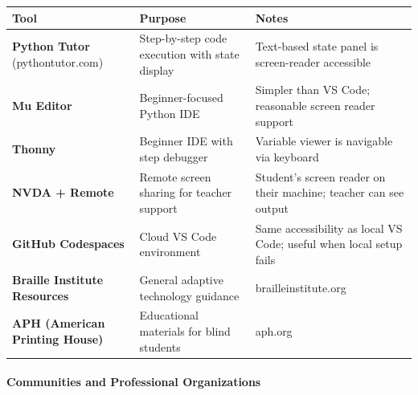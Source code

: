 \documentclass[
  justified,
  openright,
]{tufte-book}
\let\subsection\paragraph
\let\paragraph\paragraph
\let\subsection\paragraph
\let\paragraph\paragraph
\begin{document}
\begin{fullwidth}{\def\LTcaptype{none} %
\begin{longtable}[]{@{}
  >{\raggedright\arraybackslash}p{}
  >{\raggedright\arraybackslash}p{}
  >{\raggedright\arraybackslash}p{}@{}}
\toprule\noalign{}
\begin{minipage}[b]{\linewidth}\raggedright
Tool
\end{minipage} & \begin{minipage}[b]{\linewidth}\raggedright
Purpose
\end{minipage} & \begin{minipage}[b]{\linewidth}\raggedright
Notes
\end{minipage} \\
\midrule\noalign{}
\endhead
\bottomrule\noalign{}
\endlastfoot
\textbf{Python Tutor} (pythontutor.com) & Step-by-step code execution
with state display & Text-based state panel is screen-reader
accessible \\
\textbf{Mu Editor} & Beginner-focused Python IDE & Simpler than VS Code;
reasonable screen reader support \\
\textbf{Thonny} & Beginner IDE with step debugger & Variable viewer is
navigable via keyboard \\
\textbf{NVDA + Remote} & Remote screen sharing for teacher support &
Student's screen reader on their machine; teacher can see output \\
\textbf{GitHub Codespaces} & Cloud VS Code environment & Same
accessibility as local VS Code; useful when local setup fails \\
\textbf{Braille Institute Resources} & General adaptive technology
guidance & brailleinstitute.org \\
\textbf{APH (American Printing House)} & Educational materials for blind
students & aph.org \\
\end{longtable}
}
\end{fullwidth}

\subsection{Communities and Professional
Organizations}\label{communities-and-professional-organizations}
\end{document}
